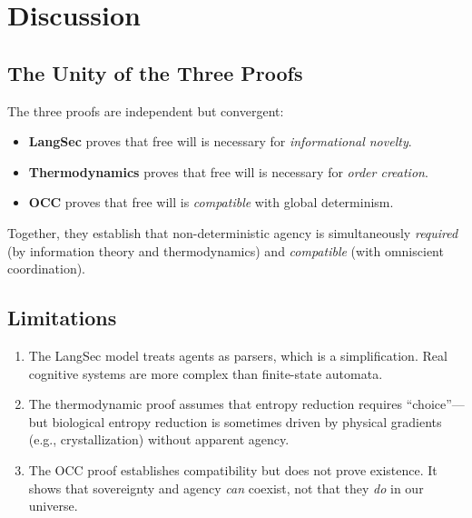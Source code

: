 \documentclass[12pt, a4paper]{article}
\theoremstyle{plain}
\theoremstyle{definition}
\begin{document}
\section{Discussion}\label{sec:discussion}

\subsection{The Unity of the Three Proofs}

The three proofs are independent but convergent:
\begin{itemize}
  \item \textbf{LangSec} proves that free will is necessary for
    \emph{informational novelty}.
  \item \textbf{Thermodynamics} proves that free will is necessary for
    \emph{order creation}.
  \item \textbf{OCC} proves that free will is \emph{compatible} with
    global determinism.
\end{itemize}

Together, they establish that non-deterministic agency is simultaneously
\emph{required} (by information theory and thermodynamics) and
\emph{compatible} (with omniscient coordination).

\subsection{Limitations}

\begin{enumerate}
  \item The LangSec model treats agents as parsers, which is a simplification.
    Real cognitive systems are more complex than finite-state automata.
  \item The thermodynamic proof assumes that entropy reduction requires
    ``choice''---but biological entropy reduction is sometimes driven by
    physical gradients (e.g., crystallization) without apparent agency.
  \item The OCC proof establishes compatibility but does not prove existence.
    It shows that sovereignty and agency \emph{can} coexist, not that they
    \emph{do} in our universe.
\end{enumerate}

\end{document}
